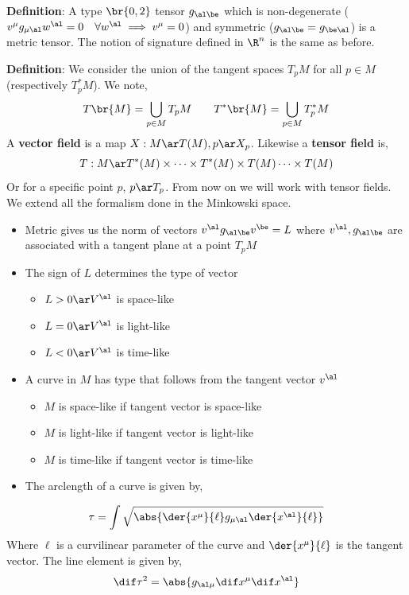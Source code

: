 \documentclass{article}
\begin{document}
\textbf{Definition}: A type $\br{0,2}$ tensor $g_{\al\be}$ which is non-degenerate ($v^\mu g_{\mu\al} w^\al = 0 \quad \forall w^\al \implies v^\mu = 0$) and symmetric ($g_{\al\be} = g_{\be\al}$) is a metric tensor. The notion of signature defined in $\R^n$ is the same as before.

\textbf{Definition}: We consider the union of the tangent spaces $T_pM$ for all $p\in M$ (respectively $T^*_pM$). We note,
\[ T\br{M} = \bigcup_{p\in M} T_p M \qquad T^*\br{M} = \bigcup_{p\in M} T^*_p M \]
A \textbf{vector field} is a map $X : M \ar T(M), p \ar X_p$. Likewise a \textbf{tensor field} is,
\[ T : M \ar T^*(M) \times \cdots \times T^*(M) \times T(M) \cdots \times T(M) \]
Or for a specific point $p$, $p \ar T_p$. From now on we will work with tensor fields. We extend all the formalism done in the Minkowski space.
\begin{itemize}
    \item Metric gives us the norm of vectors $ v^\al g_{\al\be} v^\be = L $ where $v^\al,g_{\al\be}$ are associated with a tangent plane at a point $T_pM$
    \item The sign of $L$ determines the type of vector
    \begin{itemize}
        \item $L > 0 \ar V^\al$ is space-like
        \item $L = 0 \ar V^\al$ is light-like
        \item $L < 0 \ar V^\al$ is time-like
    \end{itemize}
    \item A curve in $M$ has type that follows from the tangent vector $v^\al$
    \begin{itemize}
        \item $M$ is space-like if tangent vector is space-like
        \item $M$ is light-like if tangent vector is light-like
        \item $M$ is time-like if tangent vector is time-like
    \end{itemize}
    \item The arclength of a curve is given by,
\end{itemize}

\[ \tau = \int \sqrt{\abs{\der{x^\mu}{\ell}g_{\mu\al}\der{x^\al}{\ell}}} \]
Where $\ell$ is a curvilinear parameter of the curve and $\der{x^\mu}{\ell}$ is the tangent vector. The line element is given by,
\[ \dif \tau^2 = \abs{g_{\al\mu}\dif x^\mu \dif x^\al} \]
\end{document}
